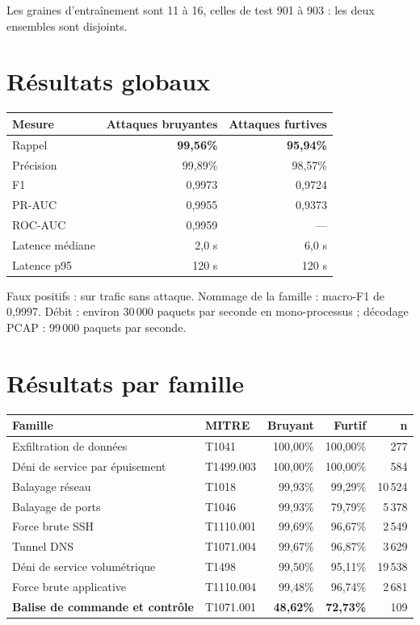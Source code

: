 \documentclass[11pt,a4paper]{article}
\begin{document}
Les graines d'entraînement sont 11 à 16, celles de test 901 à 903 : les deux ensembles sont
disjoints.

\section{Résultats globaux}

\begin{table}[h]\centering\small
\begin{tabularx}{\linewidth}{@{}X r r@{}}
\toprule
\textbf{Mesure} & \textbf{Attaques bruyantes} & \textbf{Attaques furtives} \\
\midrule
Rappel & \textbf{99,56\%} & \textbf{95,94\%} \\
Précision & 99,89\% & 98,57\% \\
F1 & 0,9973 & 0,9724 \\
PR-AUC & 0,9955 & 0,9373 \\
ROC-AUC & 0,9959 & --- \\
Latence médiane & 2,0 s & 6,0 s \\
Latence p95 & 120 s & 120 s \\
\bottomrule
\end{tabularx}
\end{table}

Faux positifs :  sur trafic sans attaque. Nommage de la famille :
macro-F1 de 0,9997. Débit : environ 30\,000 paquets par seconde en mono-processus ; décodage PCAP :
99\,000 paquets par seconde.

\section{Résultats par famille}

\begin{table}[h]\centering\small
\begin{tabularx}{\linewidth}{@{}X l r r r@{}}
\toprule
\textbf{Famille} & \textbf{MITRE} & \textbf{Bruyant} & \textbf{Furtif} & \textbf{n} \\
\midrule
Exfiltration de données & T1041 & 100,00\% & 100,00\% & 277 \\
Déni de service par épuisement & T1499.003 & 100,00\% & 100,00\% & 584 \\
Balayage réseau & T1018 & 99,93\% & 99,29\% & 10\,524 \\
Balayage de ports & T1046 & 99,93\% & 79,79\% & 5\,378 \\
Force brute SSH & T1110.001 & 99,69\% & 96,67\% & 2\,549 \\
Tunnel DNS & T1071.004 & 99,67\% & 96,87\% & 3\,629 \\
Déni de service volumétrique & T1498 & 99,50\% & 95,11\% & 19\,538 \\
Force brute applicative & T1110.004 & 99,48\% & 96,74\% & 2\,681 \\
\textbf{Balise de commande et contrôle} & T1071.001 & \textbf{48,62\%} & \textbf{72,73\%} & 109 \\
\bottomrule
\end{tabularx}
\end{table}
\end{document}
